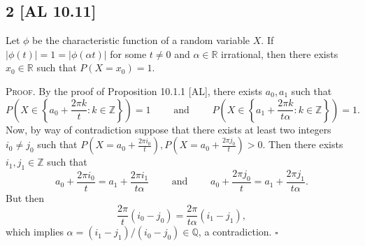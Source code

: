 \documentclass[12pt]{article}
\newcounter{ProofCounter}
\newenvironment{Proof}{\stepcounter{ProofCounter}\textsc{Proof.}}{\hfill$\square$}
\begin{document}
\subsection*{2 [AL 10.11]}
\begin{tcolorbox}
  Let $\phi$ be the characteristic function of a random variable $X$. If $|\phi(t)| = 1 = |\phi(\alpha t)|$ for some $t \neq 0$ and $\alpha \in
  \mathbb{R}$ irrational, then there exists $x_0 \in \mathbb{R}$ such that $P(X = x_0) = 1$.
\end{tcolorbox}
\begin{Proof}
  By the proof of Proposition 10.1.1 [AL], there exists $a_0, a_1$ such that
  \[
    P\left(X \in \left\{ a_0 + \frac{2\pi k}{t} : k \in \mathbb{Z} \right\}\right) = 1 \qquad \text{ and } \qquad P\left(X \in \left\{ a_1 + \frac{2\pi k}{t\alpha} :
    k \in \mathbb{Z}\right\}\right) = 1.
  \]
  Now, by way of contradiction suppose that there exists at least two integers $i_0 \neq j_0$ such that $P(X = a_0 + \frac{2\pi i_0}{t}), P(X = a_0 +
  \frac{2\pi j_0}{t}) > 0$. Then there exists $i_1, j_1 \in \mathbb{Z}$ such that
  \[
    a_0 + \frac{2\pi i_0}{t} = a_1 + \frac{2\pi i_1}{t\alpha} \qquad \text{ and } \qquad a_0 + \frac{2\pi j_0}{t} = a_1 + \frac{2\pi j_1}{t\alpha}.
  \]
  But then
  \[
    \frac{2\pi}{t}(i_0 - j_0) = \frac{2\pi}{t\alpha}(i_1 - j_1),
  \]
  which implies $\alpha = (i_1 - j_1) / (i_0 - j_0) \in \mathbb{Q}$, a contradiction.
\end{Proof}



\newpage
\end{document}
